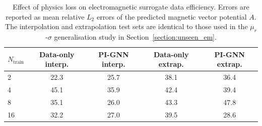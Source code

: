 \begin{table}[htbp]
    \centering
    \begin{tabular}{lcccc}
        \hline
        $N_{\mathrm{train}}$
        & Data-only interp. & PI-GNN interp. & Data-only extrap. & PI-GNN extrap. \\
        \hline
        2  & 22.3 & 25.7 & 38.1 & 36.4 \\
        4  & 45.1 & 35.9 & 42.4 & 39.4 \\
        8  & 35.1 & 26.0 & 43.3 & 47.8 \\
        16  & 32.2 & 27.0 & 39.5 & 28.6 \\
        \hline
    \end{tabular}
    \caption{Effect of physics loss on electromagnetic surrogate data efficiency. Errors are reported as mean relative \(L_2\) errors of the predicted magnetic vector potential \(A\). The interpolation and extrapolation test sets are identical to those used in the \(\mu_r\)-\(\sigma\) generalisation study in Section~\ref{section:unseen_em}.}
    \label{tab:em_physics_loss_ablation}
\end{table}
